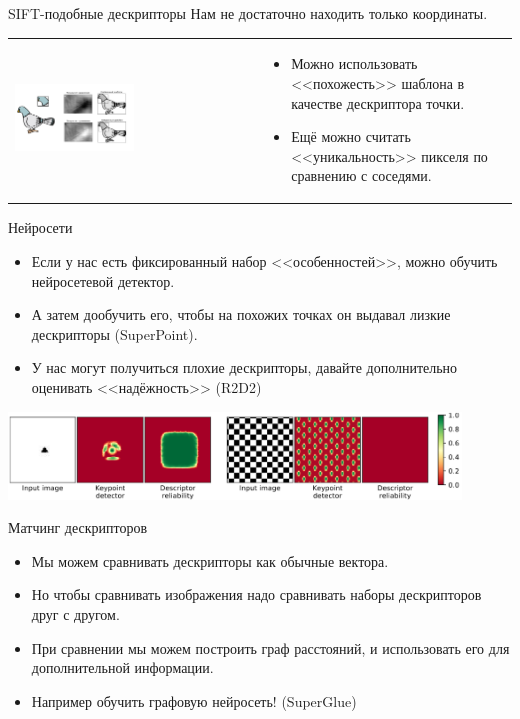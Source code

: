 \begin{frame}{SIFT-подобные дескрипторы}
Нам не достаточно находить только координаты.

\begin{tabular}{m{17em} m{20em}}
    \includegraphics[width=0.5\textwidth]{images/pigeon template matching2.png} & 
    \begin{itemize}
        \item Можно использовать <<похожесть>> шаблона в качестве дескриптора точки.
        \item Ещё можно считать <<уникальность>> пикселя по сравнению с соседями.
    \end{itemize}
\end{tabular}
    
\end{frame}

\begin{frame}{Нейросети}

\begin{itemize}
    \item Если у нас есть фиксированный набор <<особенностей>>, можно обучить нейросетевой детектор.
    \item А затем дообучить его, чтобы на похожих точках он выдавал лизкие дескрипторы (SuperPoint).
    \item У нас могут получиться плохие дескрипторы, давайте дополнительно оценивать <<надёжность>> (R2D2)
\end{itemize}

\centering
\includegraphics[width=0.9\textwidth]{images/r2d2_reliability.png}

\end{frame}

\begin{frame}{Матчинг дескрипторов}

\begin{itemize}
    \item Мы можем сравнивать дескрипторы как обычные вектора.
    \item Но чтобы сравнивать изображения надо сравнивать наборы дескрипторов друг с другом.
    \item При сравнении мы можем построить граф расстояний, и использовать его для дополнительной информации.
    \item Например обучить графовую нейросеть! (SuperGlue)
\end{itemize}
    
\end{frame}
